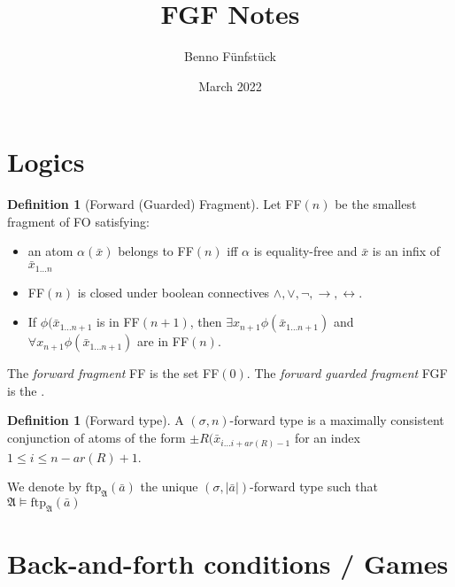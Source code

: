 \documentclass[draft]{scrartcl}
\title{FGF Notes}
\author{Benno Fünfstück}
\date{March 2022}
\theoremstyle{definition}
\newtheorem{definition}[theorem]{Definition}
\begin{document}
\maketitle

\section{Logics}

\begin{definition}[Forward (Guarded) Fragment]
Let FF$(n)$ be the smallest fragment of FO satisfying:

\begin{itemize}
    \item an atom $\alpha(\bar{x})$ belongs to FF$(n)$ iff $\alpha$ is equality-free and $\bar{x}$ is an infix of $\bar{x}_{1\ldots{}n}$
    \item FF$(n)$ is closed under boolean connectives $\land, \lor, \neg, \rightarrow, \leftrightarrow$.
    \item If $\phi(\bar{x}_{1\ldots{}n+1}$ is in FF$(n+1)$, then $\exists{x_{n+1}}\phi(\bar{x}_{1\ldots{}n+1})$ and $\forall{x_{n+1}}\phi(\bar{x}_{1\ldots{}n+1})$ are in FF$(n)$.
\end{itemize}

The \emph{forward fragment} FF is the set FF$(0)$.
The \emph{forward guarded fragment} FGF is the .
\end{definition}

\begin{definition}[Forward type]
A $(\sigma,n)$-forward type is a maximally consistent conjunction of atoms of the form $\pm{}R(\bar{x}_{i\ldots{}i+ar(R)-1}$ for an index $1 \leq i \leq n - ar(R) + 1$.
\end{definition}

We denote by $\mathrm{ftp}_\mathfrak{A}(\bar{a})$ the unique $(\sigma,|\bar{a}|)$-forward type such that $\mathfrak{A} \models \mathrm{ftp}_\mathfrak{A}(\bar{a})$

\section{Back-and-forth conditions / Games}
\end{document}
